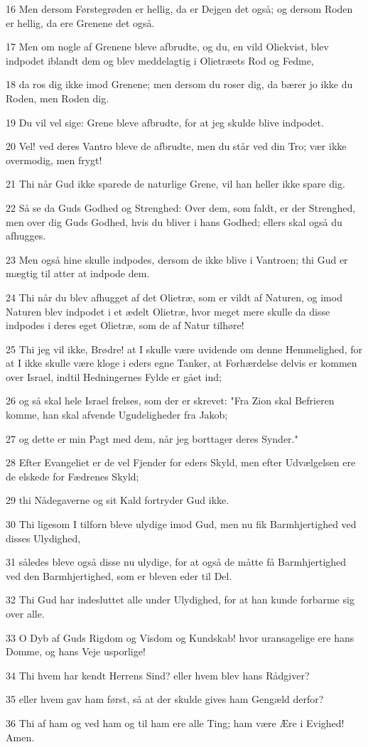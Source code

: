 \par 16 Men dersom Førstegrøden er hellig, da er Dejgen det også; og dersom Roden er hellig, da ere Grenene det også.
\par 17 Men om nogle af Grenene bleve afbrudte, og du, en vild Oliekvist, blev indpodet iblandt dem og blev meddelagtig i Olietræets Rod og Fedme,
\par 18 da ros dig ikke imod Grenene; men dersom du roser dig, da bærer jo ikke du Roden, men Roden dig.
\par 19 Du vil vel sige: Grene bleve afbrudte, for at jeg skulde blive indpodet.
\par 20 Vel! ved deres Vantro bleve de afbrudte, men du står ved din Tro; vær ikke overmodig, men frygt!
\par 21 Thi når Gud ikke sparede de naturlige Grene, vil han heller ikke spare dig.
\par 22 Så se da Guds Godhed og Strenghed: Over dem, som faldt, er der Strenghed, men over dig Guds Godhed, hvis du bliver i hans Godhed; ellers skal også du afhugges.
\par 23 Men også hine skulle indpodes, dersom de ikke blive i Vantroen; thi Gud er mægtig til atter at indpode dem.
\par 24 Thi når du blev afhugget af det Olietræ, som er vildt af Naturen, og imod Naturen blev indpodet i et ædelt Olietræ, hvor meget mere skulle da disse indpodes i deres eget Olietræ, som de af Natur tilhøre!
\par 25 Thi jeg vil ikke, Brødre! at I skulle være uvidende om denne Hemmelighed, for at I ikke skulle være kloge i eders egne Tanker, at Forhærdelse delvis er kommen over Israel, indtil Hedningernes Fylde er gået ind;
\par 26 og så skal hele Israel frelses, som der er skrevet: "Fra Zion skal Befrieren komme, han skal afvende Ugudeligheder fra Jakob;
\par 27 og dette er min Pagt med dem, når jeg borttager deres Synder."
\par 28 Efter Evangeliet er de vel Fjender for eders Skyld, men efter Udvælgelsen ere de elskede for Fædrenes Skyld;
\par 29 thi Nådegaverne og sit Kald fortryder Gud ikke.
\par 30 Thi ligesom I tilforn bleve ulydige imod Gud, men nu fik Barmhjertighed ved disses Ulydighed,
\par 31 således bleve også disse nu ulydige, for at også de måtte få Barmhjertighed ved den Barmhjertighed, som er bleven eder til Del.
\par 32 Thi Gud har indesluttet alle under Ulydighed, for at han kunde forbarme sig over alle.
\par 33 O Dyb af Guds Rigdom og Visdom og Kundskab! hvor uransagelige ere hans Domme, og hans Veje usporlige!
\par 34 Thi hvem har kendt Herrens Sind? eller hvem blev hans Rådgiver?
\par 35 eller hvem gav ham først, så at der skulde gives ham Gengæld derfor?
\par 36 Thi af ham og ved ham og til ham ere alle Ting; ham være Ære i Evighed! Amen.


